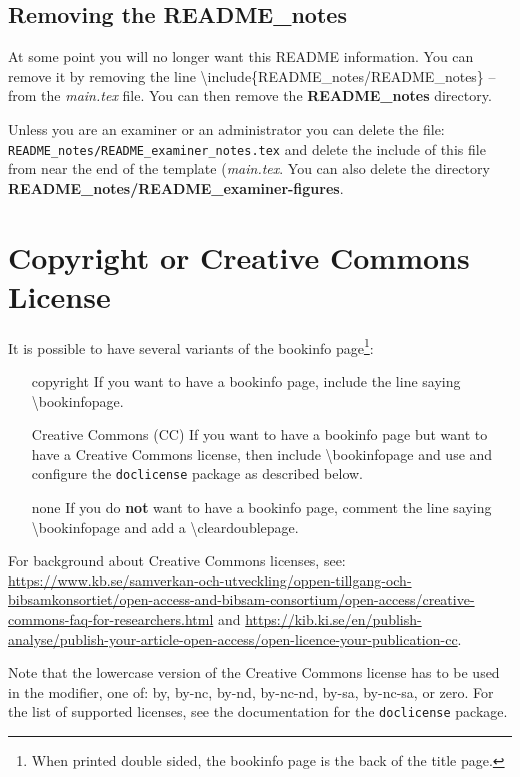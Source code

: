 \documentclass[main.tex]{subfiles}
\begin{document}
\subsection{Removing the README\_notes}
At some point you will no longer want this README information. You can remove it by removing the line
\textbackslash include\{README\_notes/README\_notes\} -- from the \textit{main.tex} file. You can then remove the \textbf{README\_notes} directory.

Unless you are an examiner or an administrator you can delete the file: \texttt{README\_notes/README\_examiner\_notes.tex} and delete the include of this file from near the end of the template (\ie \textit{main.tex}. You can also delete the directory \textbf{README\_notes/README\_examiner-figures}.


\section[Copyright or Creative Commons License]{Copyright or Creative Commons\\ License}
\label{sec:copyrightOrCClicense}
It is possible to have several variants of the bookinfo page\footnote{When printed double sided, the bookinfo page is the back of the title page.}:
\begin{enumerate}[labelwidth =\widthof{\textbf{Creative Commons (CC)}}, leftmargin = !]
    \item[copyright] If you want to have a bookinfo page, include the line saying \textbackslash bookinfopage.
    \item[Creative Commons (CC)] If you want to have a bookinfo page but want to have a Creative Commons license, then include \textbackslash bookinfopage and use and configure the \texttt{doclicense} package as described below.
    \item[none] If you do \textbf{not} want to have a bookinfo page, comment the line saying \textbackslash bookinfopage and add a \textbackslash cleardoublepage.
\end{enumerate}

For background about Creative Commons licenses, see:
\url{https://www.kb.se/samverkan-och-utveckling/oppen-tillgang-och-bibsamkonsortiet/open-access-and-bibsam-consortium/open-access/creative-commons-faq-for-researchers.html} and \url{https://kib.ki.se/en/publish-analyse/publish-your-article-open-access/open-licence-your-publication-cc}.

Note that the lowercase version of the Creative Commons license has to be used in the modifier, \ie one of: by, by-nc, by-nd, by-nc-nd, by-sa, by-nc-sa, or zero. For the list of supported licenses, see the documentation for the \texttt{doclicense} package.
\end{document}
